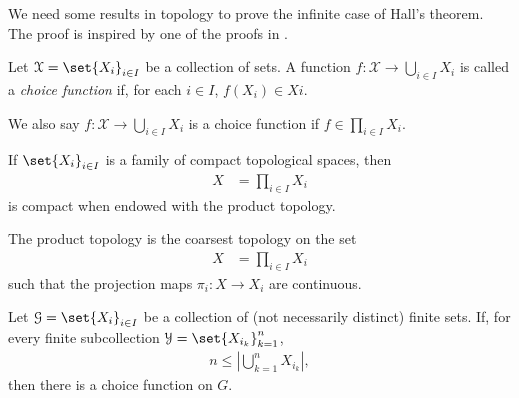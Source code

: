 \documentclass[10pt]{mypackage2}
\begin{document}
We need some results in topology to prove the infinite case of Hall's theorem. The proof is inspired by one of the proofs in \cite{marshall_hall_thm}.
\begin{definition}
  Let $\mathcal{X} = \set{X_{i}}_{i\in I}$ be a collection of sets. A function $f\colon \mathcal{X}\rightarrow \bigcup_{i\in I}X_i$ is called a \textit{choice function} if, for each $i\in I$, $f\left(X_{i}\right)\in X{i}$.\newline

  We also say $f\colon \mathcal{X}\rightarrow \bigcup_{i\in I}X_i$ is a choice function if $f\in \prod_{i\in I}X_i$.
\end{definition}

\begin{theorem}
  If $\set{X_{i}}_{i\in I}$ is a family of compact topological spaces, then
  \begin{align*}
    X &= \prod_{i\in I} X_i
  \end{align*}
  is compact when endowed with the product topology.
\end{theorem}
\begin{remark}
  The product topology is the coarsest topology on the set
  \begin{align*}
    X &= \prod_{i\in I}X_i
  \end{align*}
  such that the projection maps $\pi_i\colon X\rightarrow X_i$ are continuous.
\end{remark}
\begin{theorem}
  Let $\mathcal{G} = \set{X_{i}}_{i\in I}$ be a collection of (not necessarily distinct) finite sets. If, for every finite subcollection $\mathcal{Y} = \set{X_{i_k}}_{k=1}^{n}$,
  \begin{align*}
    n\leq \left\vert \bigcup_{k=1}^{n}X_{i_k} \right\vert,
  \end{align*}
  then there is a choice function on $G$.
\end{theorem}
\end{document}
